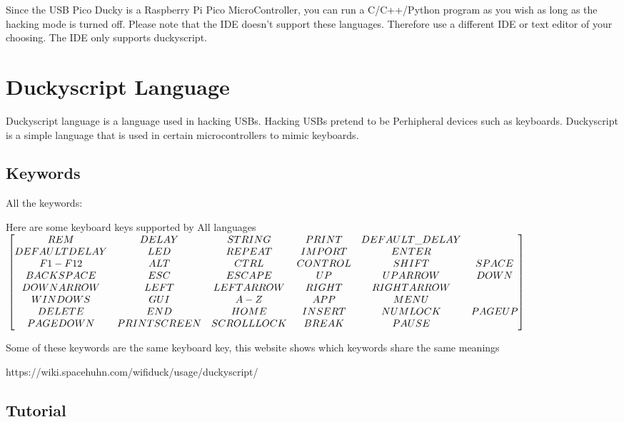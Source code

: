 \documentclass[a4paper,12pt]{article}
\begin{document}
Since the USB Pico Ducky is a Raspberry Pi Pico MicroController, you can run a C/C++/Python program as you wish as long as the hacking mode is turned off. Please note that the IDE doesn't support these languages. Therefore use a different IDE or text editor of your choosing. The IDE only supports duckyscript.

\section{Duckyscript Language}

Duckyscript language is a language used in hacking USBs. Hacking USBs pretend to be Perhipheral devices such as keyboards. Duckyscript is a simple language that is used in certain microcontrollers to mimic keyboards.

\subsection{Keywords}\label{all_keywords}

All the keywords:

Here are some keyboard keys supported by All languages
\scriptsize
$\\\begin{bmatrix} 
REM & DELAY & STRING & PRINT & DEFAULT\_DELAY
\\DEFAULTDELAY & LED & REPEAT & IMPORT & ENTER
\\F1-F12 & ALT & CTRL & CONTROL & SHIFT & SPACE
\\BACKSPACE & ESC & ESCAPE & UP & UPARROW & DOWN
\\DOWNARROW & LEFT & LEFTARROW & RIGHT & RIGHTARROW
\\WINDOWS & GUI & A-Z & APP & MENU
\\DELETE & END & HOME & INSERT & NUMLOCK & PAGEUP
\\PAGEDOWN & PRINTSCREEN & SCROLLLOCK & BREAK & PAUSE
\end{bmatrix}\\\\$
\normalsize

Some of these keywords are the same keyboard key, this website shows which keywords share the same meanings

https://wiki.spacehuhn.com/wifiduck/usage/duckyscript/

\subsection{Tutorial}
\end{document}
